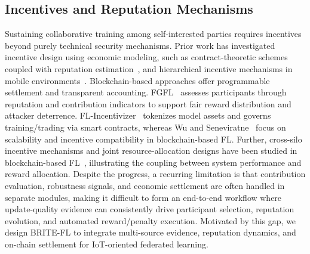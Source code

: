 \documentclass[a4paper]{cas-dc}
\begin{document}
\subsection{Incentives and Reputation Mechanisms}
Sustaining collaborative training among self-interested parties requires incentives beyond purely
technical security mechanisms. Prior work has investigated incentive design using economic modeling,
such as contract-theoretic schemes coupled with reputation estimation~\cite{37}, and hierarchical
incentive mechanisms in mobile environments~\cite{56}. Blockchain-based approaches offer programmable
settlement and transparent accounting. FGFL~\cite{7} assesses participants through reputation and
contribution indicators to support fair reward distribution and attacker deterrence.
FL-Incentivizer~\cite{27} tokenizes model assets and governs training/trading via smart contracts,
whereas Wu and Seneviratne~\cite{60} focus on scalability and incentive compatibility in
blockchain-based FL. Further, cross-silo incentive mechanisms and joint resource-allocation designs
have been studied in blockchain-based FL~\cite{10,26}, illustrating the coupling between system
performance and reward allocation.
Despite the progress, a recurring limitation is that contribution evaluation, robustness signals, and
economic settlement are often handled in separate modules, making it difficult to form an end-to-end
workflow where update-quality evidence can consistently drive participant selection, reputation
evolution, and automated reward/penalty execution. Motivated by this gap, we design BRITE-FL to
integrate multi-source evidence, reputation dynamics, and on-chain settlement for IoT-oriented
federated learning.
\end{document}
